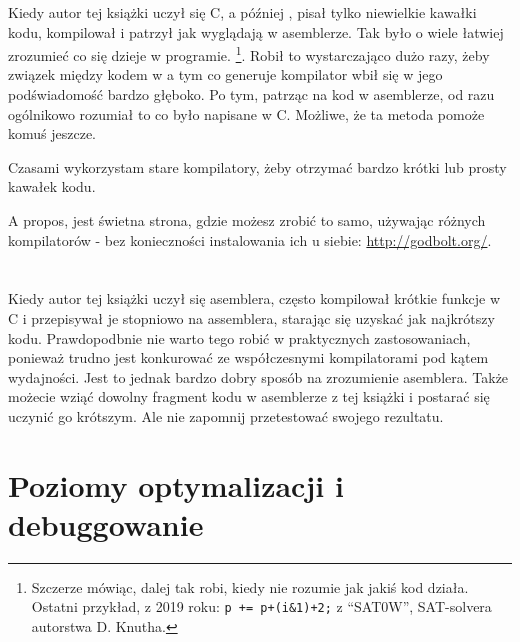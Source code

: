 
Kiedy autor tej książki uczył się C, a później \Cpp, pisał tylko niewielkie kawałki kodu, kompilował
i patrzył jak wyglądają w asemblerze. Tak było o wiele łatwiej zrozumieć co się dzieje w programie.%
\footnote{Szczerze mówiąc, dalej tak robi, kiedy nie rozumie jak jakiś kod działa.
Ostatni przykład, z 2019 roku: \verb|p += p+(i&1)+2;| z ``SAT0W'', SAT-solvera autorstwa D. Knutha.}.
Robił to wystarczająco dużo razy, żeby związek między kodem w \CCpp a tym co generuje kompilator wbił się w jego podświadomość bardzo głęboko.
Po tym, patrząc na kod w asemblerze, od razu ogólnikowo rozumiał to co było napisane w C.
Możliwe, że ta metoda pomoże komuś jeszcze.


Czasami wykorzystam stare kompilatory, żeby otrzymać bardzo krótki lub prosty kawałek kodu.

A propos, jest świetna strona, gdzie możesz zrobić to samo, używając różnych kompilatorów - bez konieczności instalowania ich u siebie: \url{http://godbolt.org/}.

\section*{\Exercises}

Kiedy autor tej książki uczył się asemblera, często kompilował krótkie funkcje w C i przepisywał
je stopniowo na assemblera, starając się uzyskać jak najkrótszy kodu.
Prawdopodbnie nie warto tego robić w praktycznych zastosowaniach,
ponieważ trudno jest konkurować ze współczesnymi kompilatorami pod kątem wydajności. Jest to jednak bardzo dobry sposób na zrozumienie asemblera.
Także możecie wziąć dowolny fragment kodu w asemblerze z tej książki i postarać się uczynić go krótszym.
Ale nie zapomnij przetestować swojego rezultatu.

\section*{Poziomy optymalizacji i debuggowanie}

